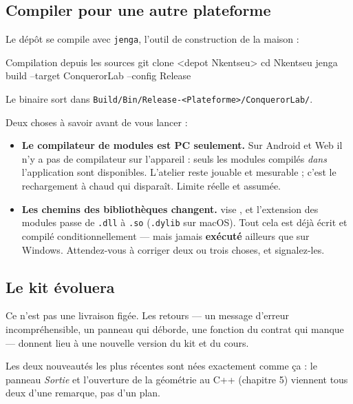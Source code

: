 \subsection{Compiler pour une autre plateforme}

Le dépôt se compile avec \texttt{jenga}, l'outil de construction de la maison :

\begin{nkcode}{Compilation depuis les sources}
git clone <depot Nkentseu>
cd Nkentseu
jenga build --target ConquerorLab --config Release
\end{nkcode}

Le binaire sort dans \texttt{Build/Bin/Release-<Plateforme>/ConquerorLab/}.

Deux choses à savoir avant de vous lancer :

\begin{itemize}
  \item \textbf{Le compilateur de modules est PC seulement.} Sur Android et Web
        il n'y a pas de compilateur sur l'appareil : seuls les modules compilés
        \emph{dans} l'application sont disponibles. L'atelier reste jouable et
        mesurable ; c'est le rechargement à chaud qui disparaît. Limite réelle et
        assumée.
  \item \textbf{Les chemins des bibliothèques changent.}  vise
        , et l'extension des modules
        passe de \texttt{.dll} à \texttt{.so} (\texttt{.dylib} sur macOS). Tout
        cela est déjà écrit et compilé conditionnellement — mais jamais
        \textbf{exécuté} ailleurs que sur Windows. Attendez-vous à corriger deux
        ou trois choses, et signalez-les.
\end{itemize}

\subsection{Le kit évoluera}

Ce n'est pas une livraison figée. Les retours — un message d'erreur
incompréhensible, un panneau qui déborde, une fonction du contrat qui manque —
donnent lieu à une nouvelle version du kit et du cours.

\begin{nkretenir}
Les deux nouveautés les plus récentes sont nées exactement comme ça : le panneau
\emph{Sortie} et l'ouverture de la géométrie au C++ (chapitre 5) viennent tous
deux d'une remarque, pas d'un plan.
\end{nkretenir}

